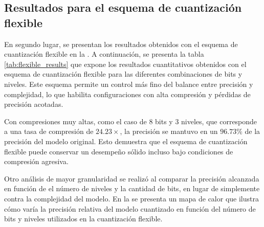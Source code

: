 

\subsection{Resultados para el esquema de cuantización flexible}
\label{sec:flexible_results}

En segundo lugar, se presentan los resultados obtenidos con el esquema de cuantización flexible en la .
A continuación, se presenta la tabla \ref{tab:flexible_results} que expone los resultados cuantitativos obtenidos con el esquema de cuantización flexible para las diferentes combinaciones de bits y niveles. Este esquema permite un control más fino del balance entre precisión y complejidad, lo que habilita configuraciones con alta compresión y pérdidas de precisión acotadas.




Con compresiones muy altas, como el caso de 8 bits y 3 niveles, que corresponde a una tasa de compresión de $24.23\times$, la precisión se mantuvo en un $96.73\%$ de la precisión del modelo original. Esto demuestra que el esquema de cuantización flexible puede conservar un desempeño sólido incluso bajo condiciones de compresión agresiva.

Otro análisis de mayor granularidad se realizó al comparar la precisión alcanzada en función de el número de niveles y la cantidad de bits, en lugar de simplemente contra la complejidad del modelo. En la  se presenta un mapa de calor que ilustra cómo varía la precisión relativa del modelo cuantizado en función del número de bits y niveles utilizados en la cuantización flexible.

